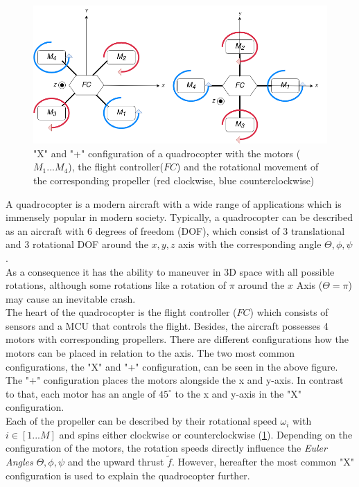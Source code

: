\begin{figure}
	\centering
	\includegraphics[width= \linewidth]{figures/quad.png} 
	\caption{"X" and "+" configuration of a quadrocopter with the motors ($M_1 ... M_4$), the flight controller($FC$) and the rotational movement of the corresponding propeller (red clockwise, blue counterclockwise)}
	\label{fig:quad}
\end{figure}

A quadrocopter is a modern aircraft with a wide range of applications which is immensely popular in modern society. 
Typically, a quadrocopter can be described as an aircraft with 6 degrees of freedom (DOF), 
which consist of 3 translational and 3 rotational DOF around the $x,y,z$ axis with the corresponding angle $\Theta, \phi, \psi$. \\
As a consequence it has the ability to maneuver in 3D space with all possible rotations, 
although some rotations like a rotation of $\pi$ around the $x$ Axis ($\Theta = \pi$) may cause an inevitable crash. \\
The heart of the quadrocopter is the flight controller ($FC$) which consists of sensors and a MCU that controls the flight. 
Besides, the aircraft possesses 4 motors with corresponding propellers. 
There are different configurations how the motors can be placed in relation to the axis. 
The two most common configurations, the "X" and "+" configuration, can be seen in the above figure. 
The "+" configuration places the motors alongside the x and y-axis. In contrast to that, each motor has an angle of $45^{\circ}$ to the x and y-axis in the "X" configuration.\\
Each of the propeller can be described by their rotational speed $\omega_i$ with $i \in [1...M]$ and spins either clockwise or counterclockwise (\cref{fig:quad}). 
Depending on the configuration of the motors,
the rotation speeds directly influence the \emph{Euler Angles} $\Theta, \phi, \psi$ and
the upward thrust $\tilde{f}$. However, hereafter the most common "X" configuration is used to explain the quadrocopter further.

